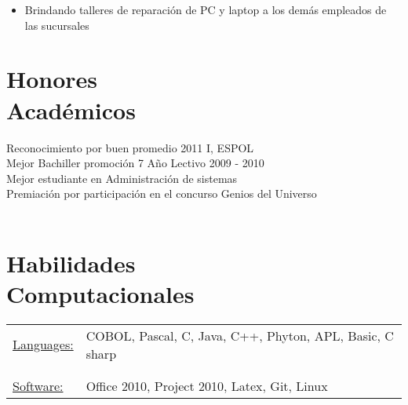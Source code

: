 \documentclass[margin]{res}
\begin{document}
\begin{resume}
\begin{itemize}
                 \item Brindando talleres de reparación de PC y laptop a los demás empleados de las sucursales\\



		 \end{itemize}


\section{Honores \\ Académicos} 
Reconocimiento por buen promedio 2011 I, ESPOL\\
Mejor Bachiller promoción 7 Año Lectivo 2009 - 2010 \\
Mejor estudiante en Administración de sistemas\\
Premiación por participación en el concurso Genios del Universo \\ \\

 

\section{Habilidades \\ Computacionales}
   \begin{tabular}{l p{3in}}
    \underline{Languages:} & COBOL, Pascal, C, Java, C++, Phyton, APL,   Basic, C sharp \\ \\ \\

     \underline{Software:} &  Office 2010, Project 2010, Latex, Git, Linux
 \end{tabular}

\end{resume} 
\end{document}
